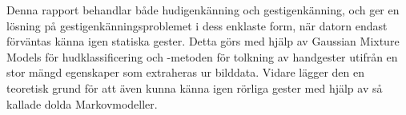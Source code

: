 \documentclass[../rapport_MVEX01-11-05]{subfiles}
\begin{document}
Denna rapport behandlar både hudigenkänning och gestigenkänning, och ger en
lösning på gestigenkänningsproblemet i dess enklaste form, när
datorn endast förväntas känna igen statiska gester. Detta görs med hjälp av
Gaussian Mixture Models för hudklassificering och \knn-metoden för tolkning
av handgester utifrån en stor mängd egenskaper som extraheras ur bilddata.
Vidare lägger den en
teoretisk grund för att även kunna känna igen rörliga gester med hjälp av
så kallade dolda Markovmodeller.
\end{document}
